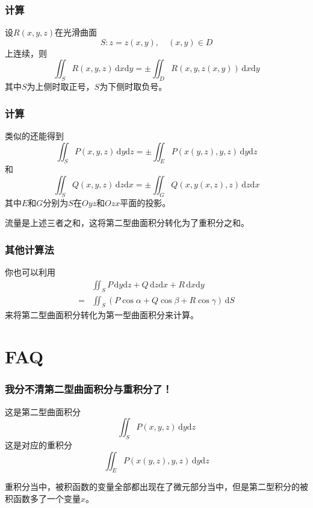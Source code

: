\documentclass[xetex]{beamer}
\begin{document}
    \begin{frame}
        \frametitle{计算}
    
        设$R(x,y,z)$在光滑曲面$$S:z=z(x,y),\quad (x,y)\in D$$
        上连续，则
        $$\iint_SR(x,y,z)\,\mathrm{d}x\mathrm{d}y = \pm \iint_DR(x,y,z(x,y))\,\mathrm{d}x\mathrm{d}y$$
        其中$S$为上侧时取正号，$S$为下侧时取负号。
    
    \end{frame}

    \begin{frame}
        \frametitle{计算}
    
        类似的还能得到
        $$\iint_SP(x,y,z)\,\mathrm{d}y\mathrm{d}z = \pm \iint_EP(x(y,z),y,z)\,\mathrm{d}y\mathrm{d}z$$
        和
        $$\iint_SQ(x,y,z)\,\mathrm{d}z\mathrm{d}x = \pm \iint_GQ(x,y(x,z),z)\,\mathrm{d}z\mathrm{d}x$$
        其中$E$和$G$分别为$S$在$Oyz$和$Ozx$平面的投影。\pause

        流量是上述三者之和，这将第二型曲面积分转化为了\alert{重积分}之和。
    
    \end{frame}

    \begin{frame}
        \frametitle{其他计算法}
    
        你也可以利用
        $$\begin{aligned}
            & \iint_SP\,\mathrm{d}y\mathrm{d}z+Q\,\mathrm{d}z\mathrm{d}x+R\,\mathrm{d}x\mathrm{d}y \\
            = & \iint_S(P\cos\alpha+Q\cos\beta+R\cos\gamma)\,\mathrm{d}S
        \end{aligned}$$
        来将第二型曲面积分转化为\alert{第一型曲面积分}来计算。
    
    \end{frame}

    \section{FAQ}

    \begin{frame}
        \frametitle{我分不清第二型曲面积分与重积分了！}
    
        这是第二型曲面积分
        $$\iint_SP(x,y,z)\,\mathrm{d}y\mathrm{d}z$$\pause
        这是对应的重积分
        $$\iint_EP(x(y,z),y,z)\,\mathrm{d}y\mathrm{d}z$$\pause

        重积分当中，被积函数的变量\alert{全部都出现}在了微元部分当中，但是第二型积分的被积函数多了一个变量$x$。
    
    \end{frame}
\end{document}
